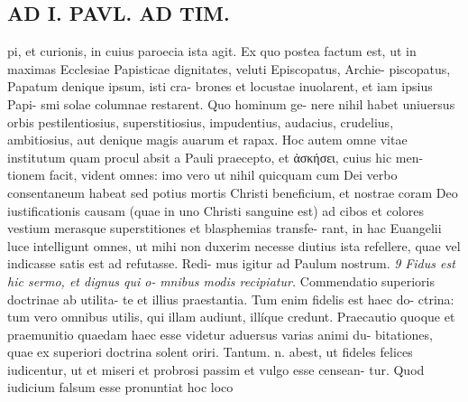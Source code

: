 \documentclass{article}
\begin{document}
\begin{pages}
\section*{AD I. PAVL. AD TIM. }
\marginpar{[ p.224 ]}pi, et curionis, in cuius paroecia ista agit. Ex quo postea factum est, ut in maximas Ecclesiae Papisticae dignitates, veluti Episcopatus, Archie- piscopatus, Papatum denique ipsum, isti cra- brones et locustae inuolarent, et iam ipsius Papi- smi solae columnae restarent. Quo hominum ge- nere nihil habet uniuersus orbis pestilentiosius, superstitiosius, impudentius, audacius, crudelius, ambitiosius, aut denique magis auarum et rapax. Hoc autem omne vitae institutum quam procul absit a Pauli praecepto, et ἀσκήσει, cuius hic men- tionem facit, vident omnes: imo vero ut nihil quicquam cum Dei verbo consentaneum habeat sed potius mortis Christi beneficium, et nostrae coram Deo iustificationis causam (quae in uno Christi sanguine est) ad cibos et colores vestium merasque superstitiones et blasphemias transfe- rant, in hac Euangelii luce intelligunt omnes, ut mihi non duxerim necesse diutius ista refellere, quae vel indicasse satis est ad refutasse. Redi- mus igitur ad Paulum nostrum. \textit{9} \textit{Fidus est hic sermo, et dignus qui o-} \textit{mnibus modis recipiatur.} Commendatio superioris doctrinae ab utilita- te et illius praestantia. Tum enim fidelis est haec do- ctrina: tum vero omnibus utilis, qui illam audiunt, illíque credunt. Praecautio quoque et praemunitio quaedam haec esse videtur aduersus varias animi du- bitationes, quae ex superiori doctrina solent oriri. Tantum. n. abest, ut fideles felices iudicentur, ut et miseri et probrosi passim et vulgo esse censean- tur. Quod iudicium falsum esse pronuntiat hoc loco 

\end{pages}
\end{document}
